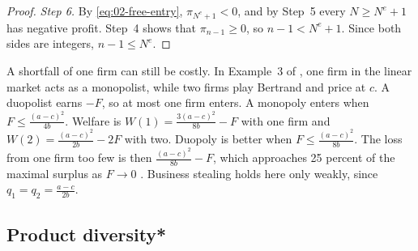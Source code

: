 \begin{proof}
\emph{Step 6.} By \eqref{eq:02-free-entry}, $\pi_{N^e + 1} < 0$, and by Step~5 every $N \ge N^e + 1$ has negative
profit. Step~4 shows that $\pi_{n-1} \ge 0$, so $n - 1 < N^e + 1$. Since both sides are integers, $n - 1 \le N^e$.
\end{proof}

A shortfall of one firm can still be costly. In Example~3 of \citet{MankiwWhinston1986}, one firm in the linear market
acts as a monopolist, while two firms play Bertrand and price at $c$. A duopolist earns $-F$, so at most one firm
enters. A monopoly enters when $F \le \frac{(a - c)^2}{4b}$. Welfare is $W(1) = \frac{3(a - c)^2}{8b} - F$ with one
firm and $W(2) = \frac{(a - c)^2}{2b} - 2F$ with two. Duopoly is better when $F \le \frac{(a - c)^2}{8b}$. The loss
from one firm too few is then $\frac{(a - c)^2}{8b} - F$, which approaches 25 percent of the maximal surplus as
$F \to 0$ \citep[pp.~53--54]{MankiwWhinston1986}. Business stealing holds here only weakly, since
$q_1 = q_2 = \frac{a - c}{2b}$.

\subsection{Product diversity*}\label{sec:02-diversity}

